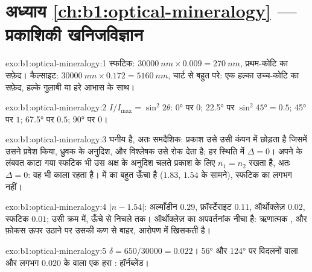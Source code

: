 \section*{अध्याय \ref{ch:b1:optical-mineralogy} --- प्रकाशिकी खनिजविज्ञान}

\begin{solution}{exo:b1:optical-mineralogy:1}
स्फटिक: $\qty{30000}{nm}\times0.009 = \qty{270}{nm}$, प्रथम-कोटि का सफ़ेद।
कैल्साइट: $\qty{30000}{nm}\times0.172 = \qty{5160}{nm}$, चार्ट से बहुत परे: एक हल्का उच्च-कोटि का सफ़ेद, हल्के
गुलाबी या हरे आभास के साथ।
\end{solution}

\begin{solution}{exo:b1:optical-mineralogy:2}
$I/I_{\max} = \sin^2 2\theta$: \ang{0} पर $0$; \ang{22.5} पर $\sin^2\ang{45} = 0.5$; \ang{45} पर $1$; \ang{67.5} पर $0.5$;
\ang{90} पर $0$।
\end{solution}

\begin{solution}{exo:b1:optical-mineralogy:3}
 घनीय है, अतः समदैशिक: प्रकाश उसे उसी कंपन में छोड़ता है जिसमें उसने प्रवेश किया, ध्रुवक के अनुदिश, और विश्लेषक
उसे रोक देता है; हर स्थिति में $\Delta = 0$। अपने  के लंबवत काटा गया स्फटिक भी उस अक्ष के अनुदिश चलते
प्रकाश के लिए $n_1 = n_2$ रखता है, अतः $\Delta = 0$: वह भी काला रहता है।  में  का  बहुत ऊँचा
है ($1.83$, $1.54$ के सामने), स्फटिक का लगभग नहीं।
\end{solution}

\begin{solution}{exo:b1:optical-mineralogy:4}
$|n - 1.54|$: अल्माँडीन $0.29$, फ़ॉर्स्टेराइट $0.11$, ऑर्थोक्लेज़ $0.02$, स्फटिक $0.01$;  उसी क्रम में, ऊँचे से निचले तक।
ऑर्थोक्लेज़ का अपवर्तनांक नीचा है: ऋणात्मक , और फ़ोकस ऊपर उठाने पर उसकी  कण से बाहर, आरोपण में खिसकती है।
\end{solution}

\begin{solution}{exo:b1:optical-mineralogy:5}
$\delta = 650/30000 = 0.022$। \ang{56} और \ang{124} पर विदलनों वाला और लगभग $0.020$ के  वाला एक हरा 
: हॉर्नब्लेंड।
\end{solution}

